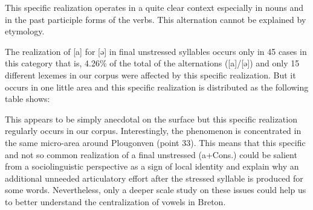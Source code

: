 \documentclass[output=paper]{LSP/langsci}
\begin{document}
This specific realization operates in a quite clear context especially in nouns and in the past participle forms of the verbs. This alternation cannot be explained by etymology. 

The realization of [a] for [ə] in final unstressed syllables occurs only in 45 cases in this category that is, 4.26\% of the total of the alternations ([a]/[ə]) and only 15 different lexemes in our corpus were affected by this specific realization. But it occurs in one little area and this specific realization is distributed as the following table shows:

\begin{table}
\label{tab:7}
\caption{Distribution of the different occurrences of (a+Cons.) according to the location investigated}
\end{table}

This appears to be simply anecdotal on the surface but this specific realization regularly occurs in our corpus. Interestingly, the phenomenon is concentrated in the same micro-area around Plougonven (point 33). This means that this specific and not so common realization of a final unstressed (a+Cons.) could be salient from a sociolinguistic perspective as a sign of local identity and explain why an additional unneeded articulatory effort after the stressed syllable is produced for some words. Nevertheless, only a deeper scale study on these issues could help us to better understand the centralization of vowels in Breton.
\end{document}

